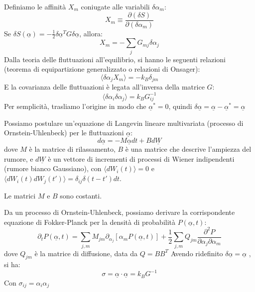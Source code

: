 \noindent Definiamo le affinità $X_m$ coniugate alle variabili $\delta\alpha_m$:
\begin{equation}
X_{m} \equiv \frac{\partial(\delta S)}{\partial(\delta\alpha_{m})}
\end{equation}
Se $\delta S(\underline{\alpha})=-\frac{1}{2}\delta\underline{\alpha}^{T}G\delta\underline{\alpha}$, allora:
\begin{equation}
X_{m} = -\sum_j G_{mj}\delta\alpha_{j}
\end{equation}
Dalla teoria delle fluttuazioni all'equilibrio, si hanno le seguenti relazioni (teorema di equipartizione generalizzato o relazioni di Onsager):
\begin{equation}
\langle\delta\alpha_{j}X_{m}\rangle=-k_{B}\delta_{jm}
\end{equation}
E la covarianza delle fluttuazioni è legata all'inversa della matrice $G$:
\begin{equation}
\langle\delta\alpha_{i}\delta\alpha_{j}\rangle=k_{B}G_{ij}^{-1}
\end{equation}
Per semplicità, trasliamo l'origine in modo che $\underline{\alpha}^{*}=0$, quindi $\delta\underline{\alpha}=\underline{\alpha}-\underline{\alpha}^{*}=\underline{\alpha}$

\noindent Possiamo postulare un'equazione di Langevin lineare multivariata (processo di Ornstein-Uhlenbeck) per le fluttuazioni $\underline{\alpha}$:
\begin{equation}
d\underline{\alpha}=-M\underline{\alpha}dt+Bd\underline{W}
\end{equation}
dove $M$ è la matrice di rilassamento, $B$ è una matrice che descrive l'ampiezza del rumore, e $d\underline{W}$ è un vettore di incrementi di processi di Wiener indipendenti (rumore bianco Gaussiano), con $\langle dW_i(t) \rangle = 0$ e $\langle dW_i(t) dW_j(t') \rangle = \delta_{ij} \delta(t-t') dt$.

\noindent Le matrici $M$ e $B$ sono costanti.

\noindent Da un processo di Ornstein-Uhlenbeck, possiamo derivare la corrispondente equazione di Fokker-Planck per la densità di probabilità $P(\underline{\alpha},t)$:
\begin{equation}
\partial_{t}P(\underline{\alpha},t)= \sum_{j,m} M_{jm}\partial_{\alpha_j}[\alpha_{m}P(\underline{\alpha},t)] + \frac{1}{2}\sum_{j,m} Q_{jm}\frac{\partial^{2}P}{\partial\alpha_{j}\partial\alpha_{m}}
\end{equation}
dove $Q_{jm}$ è la matrice di diffusione, data da $Q = BB^T$
Avendo ridefinito $\delta\underline{\alpha}=\underline{\alpha}$ , si ha:
\begin{equation}
\sigma = \underline{\alpha} \cdot\underline{\alpha}=k_{B}G^{-1}
\end{equation}
Con $\sigma_{ij} = \alpha_i \alpha_j$

